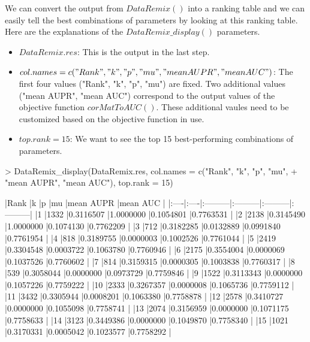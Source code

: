 \documentclass{article}
\begin{document}
We can convert the output from $DataRemix()$ into a ranking table and we can easily tell the best combinations of parameters by looking at this ranking table. Here are the explanations of the $DataRemix\_display()$ parameters.
\begin{itemize}
\item \textbf{$DataRemix.res$}: This is the output in the last step. 
\item \textbf{$col.names = c("Rank", "k", "p", "mu", "mean AUPR", "mean AUC")$}: The first four values ("Rank", "k", "p", "mu") are fixed. Two additional values ("mean AUPR", "mean AUC") correspond to the output values of the objective function $corMatToAUC()$. These additional vaules need to be customized based on the objective function in use.
\item \textbf{$top.rank = 15$}: We want to see the top 15 best-performing combinations of parameters.
\end{itemize}
\begin{Schunk}
\begin{Sinput}
> DataRemix_display(DataRemix.res, col.names = c("Rank", "k", "p", "mu", 
+                   "mean AUPR", "mean AUC"), top.rank = 15)
\end{Sinput}
\begin{Soutput}
|Rank |k    |p         |mu        |mean AUPR |mean AUC  |
|:----|:----|:---------|:---------|:---------|:---------|
|1    |1332 |0.3116507 |1.0000000 |0.1054801 |0.7763531 |
|2    |2138 |0.3145490 |1.0000000 |0.1074130 |0.7762209 |
|3    |712  |0.3182285 |0.0132889 |0.0991840 |0.7761954 |
|4    |818  |0.3189755 |0.0000003 |0.1002526 |0.7761044 |
|5    |2419 |0.3304548 |0.0003722 |0.1063780 |0.7760946 |
|6    |2175 |0.3554004 |0.0000069 |0.1037526 |0.7760602 |
|7    |814  |0.3159315 |0.0000305 |0.1003838 |0.7760317 |
|8    |539  |0.3058044 |0.0000000 |0.0973729 |0.7759846 |
|9    |1522 |0.3113343 |0.0000000 |0.1057226 |0.7759222 |
|10   |2333 |0.3267357 |0.0000008 |0.1065736 |0.7759112 |
|11   |3432 |0.3305944 |0.0008201 |0.1063380 |0.7758878 |
|12   |2578 |0.3410727 |0.0000000 |0.1055098 |0.7758741 |
|13   |2074 |0.3156959 |0.0000000 |0.1071175 |0.7758633 |
|14   |3123 |0.3449386 |0.0000000 |0.1049870 |0.7758340 |
|15   |1021 |0.3170331 |0.0005042 |0.1023577 |0.7758292 |
\end{Soutput}
\end{Schunk}
\end{document}
